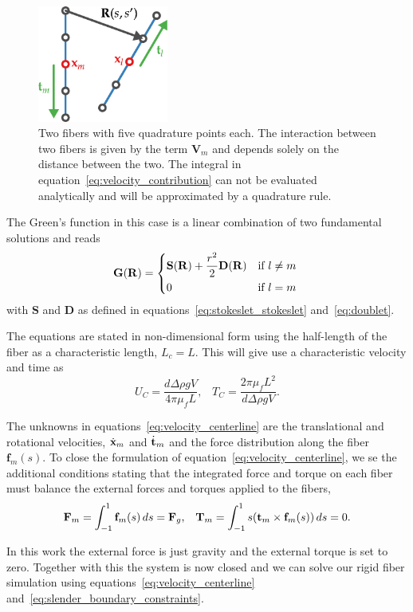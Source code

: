 \begin{figure}[!htbp]
  \centering
  \includegraphics[width=0.3819660112501450000000\textwidth]{img/fiber_contribution.pdf}
  \caption[Two interacting fibers with five quadrature points.]{Two fibers with five quadrature points each. The interaction between two fibers is given by the term $\mathbf{V}_m$ and depends solely on the distance between the two. The integral in equation~\eqref{eq:velocity_contribution} can not be evaluated analytically and will be approximated by a quadrature rule.}
  \label{fig:fiber_contribution}
\end{figure}

The Green's function in this case is a linear combination of two fundamental solutions and reads
\begin{equation}
  \label{eq:green_function}
  \mathbf{G}(\mathbf{R}) = \begin{dcases*}
  \mathbf{S}(\mathbf{R}) + \frac{r^2}{2}\mathbf{D}(\mathbf{R}) & if $l \neq m$\\
  0 & if $l = m$
  \end{dcases*}
\end{equation}
with $\mathbf{S}$ and $\mathbf{D}$ as defined in equations~\eqref{eq:stokeslet_stokeslet} and~\eqref{eq:doublet}.

The equations are stated in non-dimensional form using the half-length of the fiber as a characteristic length, $L_c = L$. This will give use a characteristic velocity and time as
\begin{equation}
  U_C = \frac{d \Delta \rho g V}{4\pi\mu_fL} \text{,} \quad T_C = \frac{2\pi\mu_fL^2}{d \Delta \rho g V} \text{.}
\end{equation}

The unknowns in equations~\eqref{eq:velocity_centerline} are the translational and rotational velocities, $\dot{\mathbf{x}}_m$ and $\dot{\mathbf{t}}_m$ and the force distribution along the fiber $\mathbf{f}_m(s)$. To close the formulation of equation~\eqref{eq:velocity_centerline}, we se the additional conditions stating that the integrated force and torque on each fiber must balance the external forces and torques applied to the fibers,
\begin{equation}
	\label{eq:slender_boundary_constraints}
  \mathbf{F}_m = \int_{-1}^{1} \mathbf{f}_m(s) \, ds = \mathbf{F}_g \text{,} \quad \mathbf{T}_m = \int_{-1}^{1} s(\mathbf{t}_m \times \mathbf{f}_m(s)) \, ds = 0 \text{.}
\end{equation}

In this work the external force is just gravity and the external torque is set to zero. Together with this the system is now closed and we can solve our rigid fiber simulation using equations~\eqref{eq:velocity_centerline} and~\eqref{eq:slender_boundary_constraints}.